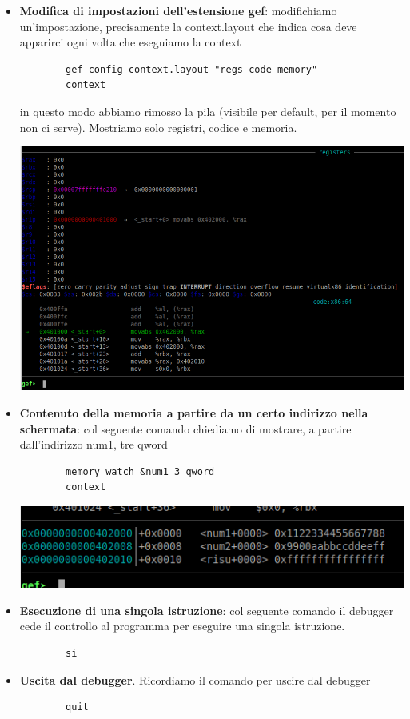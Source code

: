 \begin{itemize}
\begin{center}
	\end{center}
	\item \textbf{Modifica di impostazioni dell'estensione gef}: modifichiamo un'impostazione, precisamente la context.layout che indica cosa deve apparirci ogni volta che eseguiamo la context
	\begin{verbatim}
		gef config context.layout "regs code memory"
		context
	\end{verbatim}
	in questo modo abbiamo rimosso la pila (visibile per default, per il momento non ci serve). Mostriamo solo registri, codice e memoria.
	\begin{center}
		\includegraphics[scale=.9]{img/147.PNG}
	\end{center}
	\item \textbf{Contenuto della memoria a partire da un certo indirizzo nella schermata}: col seguente comando chiediamo di mostrare, a partire dall'indirizzo num1, tre qword
	\begin{verbatim}
		memory watch &num1 3 qword
		context
	\end{verbatim}
	\begin{center}
		\includegraphics[scale=.9]{img/148.PNG}
	\end{center}
	\item \textbf{Esecuzione di una singola istruzione}: col seguente comando 
	il debugger cede il controllo al programma per eseguire una singola istruzione.
	\begin{verbatim}
		si
	\end{verbatim} 
	\item \textbf{Uscita dal debugger}. Ricordiamo il comando per uscire dal debugger
	\begin{verbatim}
		quit
	\end{verbatim}
\end{itemize}

